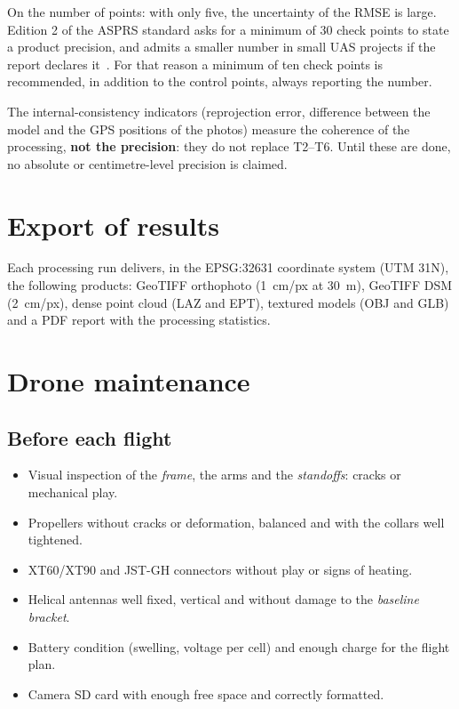On the number of points: with only five, the uncertainty of the RMSE is large. Edition 2 of the ASPRS standard asks for a minimum of 30 check points to state a product precision, and admits a smaller number in small UAS projects if the report declares it~\cite{asprs2023}. For that reason a minimum of ten check points is recommended, in addition to the control points, always reporting the number.

The internal-consistency indicators (reprojection error, difference between the model and the GPS positions of the photos) measure the coherence of the processing, \textbf{not the precision}: they do not replace T2--T6. Until these are done, no absolute or centimetre-level precision is claimed.

\section{Export of results}
\label{sec:exportacio}

Each processing run delivers, in the EPSG:32631 coordinate system (UTM 31N), the following products: GeoTIFF orthophoto (1~cm/px at 30~m), GeoTIFF DSM (2~cm/px), dense point cloud (LAZ and EPT), textured models (OBJ and GLB) and a PDF report with the processing statistics.

\section{Drone maintenance}
\label{sec:manteniment}

\subsection{Before each flight}
\begin{itemize}
    \item Visual inspection of the \emph{frame}, the arms and the \emph{standoffs}: cracks or mechanical play.
    \item Propellers without cracks or deformation, balanced and with the collars well tightened.
    \item XT60/XT90 and JST-GH connectors without play or signs of heating.
    \item Helical antennas well fixed, vertical and without damage to the \emph{baseline} \emph{bracket}.
    \item Battery condition (swelling, voltage per cell) and enough charge for the flight plan.
    \item Camera SD card with enough free space and correctly formatted.
\end{itemize}

